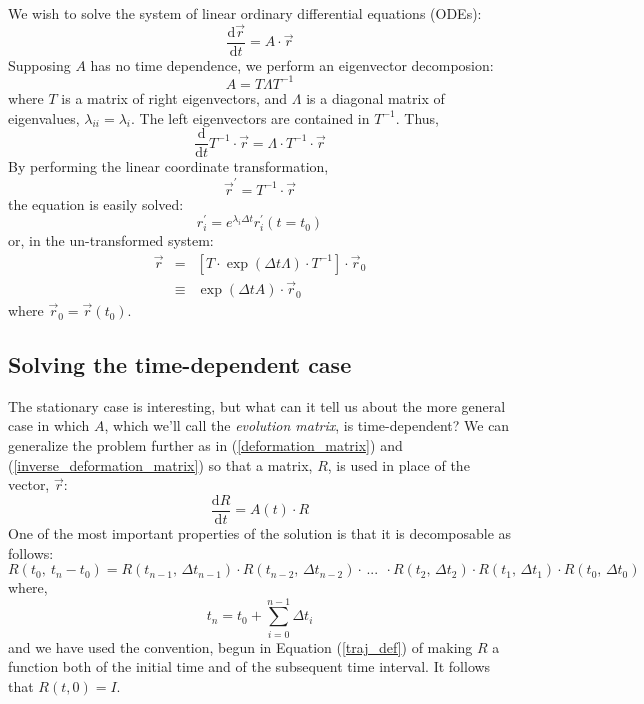 \documentclass[11pt]{article}
\begin{document}
We wish to solve the system of linear ordinary differential equations (ODEs):
\begin{equation}
\frac{\mathrm d \vec r}{\mathrm d t}=A \cdot \vec r
\label{linear_ODE_system_vector_soln}
\end{equation}
Supposing $A$ has no time dependence, we perform an eigenvector 
decomposion:
\begin{equation}
  A = T \Lambda T^{-1}
\end{equation}
where $T$ is a matrix of right eigenvectors, and $\Lambda$ is a diagonal matrix
of eigenvalues, $\lambda_{ii}=\lambda_i$.  
The left eigenvectors are contained in $T^{-1}$.
Thus,
\begin{equation}
  \frac{\mathrm d}{\mathrm d t} T^{-1} \cdot \vec r=\Lambda \cdot T^{-1} \cdot  \vec r
\end{equation}
By performing the linear coordinate transformation,
\begin{equation}
  \vec r^\prime=T^{-1} \cdot \vec r
\end{equation}
the equation is easily solved:
\begin{equation}
r^\prime_i = e^{\lambda_i \Delta t} r^\prime_i(t=t_0)
\end{equation}
or, in the un-transformed system:
\begin{eqnarray}
  \vec r & = & \left [T \cdot \exp(\Delta t \Lambda) \cdot T^{-1} \right ] \cdot \vec r_0 
\label{solution_no_time_dependence} \\
& \equiv & \exp(\Delta t A)\cdot \vec r_0
\end{eqnarray}
where $\vec r_0=\vec r(t_0)$.

\subsection{Solving the time-dependent case}

The stationary case is interesting, but what can it tell us about the 
more general case in which $A$, which we'll call the {\it evolution matrix},
is time-dependent?
We can generalize the problem further as in (\ref{deformation_matrix}) and
(\ref{inverse_deformation_matrix}) so that a matrix, $R$, 
is used in place of the vector, $\vec r$:
\begin{equation}
\frac{\mathrm d R}{\mathrm d t}=A(t) \cdot R
\label{linear_ODE_system_matrix_soln}
\end{equation}
One of the most important properties of the solution is that it
is decomposable as follows:
\begin{equation}
R(t_0,~t_n-t_0) = R(t_{n-1},\,\Delta t_{n-1}) \cdot R(t_{n-2},\,\Delta t_{n-2}) \cdot \, ...~~ 
	\cdot R(t_2,\, \Delta t_2) \cdot R(t_1,\,\Delta t_1) \cdot R(t_0,\,\Delta t_0)
\label{matrix_soln_decomposition}
\end{equation}
where,
\begin{equation}
t_n=t_0+\sum_{i=0}^{n-1} \Delta t_i
\end{equation}
and we have used the convention, begun
in Equation (\ref{traj_def}) of making $R$ a function both of the
initial time and of the subsequent time interval.  
It follows that $R(t, 0)=I$.
\end{document}
